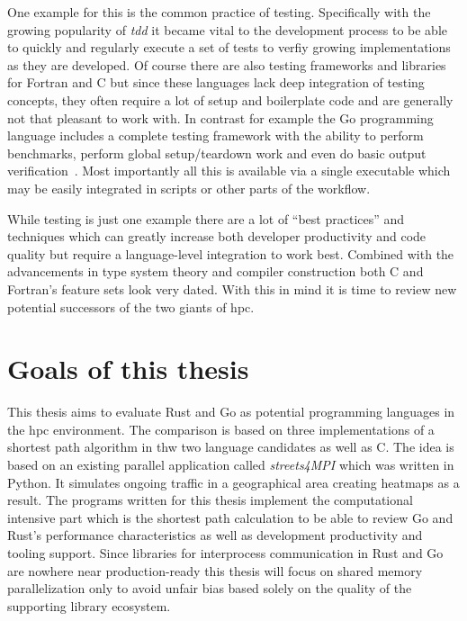 One example for this is the common practice of testing. Specifically with the growing popularity of \textit{\gls{tdd}} it became vital to the development process to be able to quickly and regularly execute a set of tests to verfiy growing implementations as they are developed. Of course there are also testing frameworks and libraries for Fortran and C but since these languages lack deep integration of testing concepts, they often require a lot of setup and boilerplate code and are generally not that pleasant to work with. In contrast for example the Go programming language includes a complete testing framework with the ability to perform benchmarks, perform global setup/teardown work and even do basic output verification~\cite{go_doc_testing}. Most importantly all this is available via a single executable  which may be easily integrated in scripts or other parts of the workflow.

While testing is just one example there are a lot of ``best practices'' and techniques which can greatly increase both developer productivity and code quality but require a language-level integration to work best. Combined with the advancements in type system theory and compiler construction both C and Fortran's feature sets look very dated. With this in mind it is time to review new potential successors of the two giants of \gls{hpc}.

\section{Goals of this thesis}
\label{sec:Introduction::Goals}

This thesis aims to evaluate Rust and Go as potential programming languages in the \gls{hpc} environment. The comparison is based on three implementations of a shortest path algorithm in thw two language candidates as well as C. The idea is based on an existing parallel application called \textit{streets4MPI} which was written in Python. It simulates ongoing traffic in a geographical area creating heatmaps as a result. The programs written for this thesis implement the computational intensive part which is the shortest path calculation to be able to review Go and Rust's performance characteristics as well as development productivity and tooling support. Since libraries for interprocess communication in Rust and Go are nowhere near production-ready this thesis will focus on shared memory parallelization only to avoid unfair bias based solely on the quality of the supporting library ecosystem.

